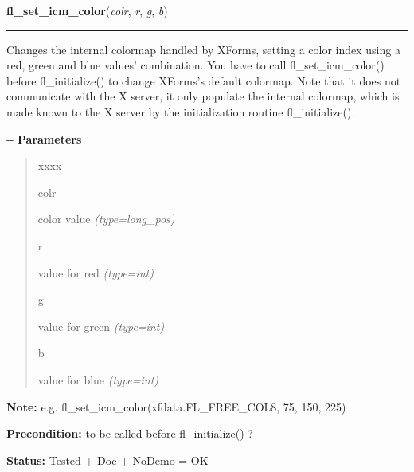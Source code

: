     \vspace{0.5ex}

\hspace{.8\funcindent}\begin{boxedminipage}{\funcwidth}

    \raggedright \textbf{fl\_set\_icm\_color}(\textit{colr}, \textit{r}, \textit{g}, \textit{b})

    \vspace{-1.5ex}

    \rule{\textwidth}{0.5\fboxrule}
\setlength{\parskip}{2ex}

Changes the internal colormap handled by XForms, setting a color index
using a red, green and blue values' combination. You have to call
fl\_set\_icm\_color() before fl\_initialize() to change XForms's default
colormap. Note that it does not communicate with the X server, it only
populate the internal colormap, which is made known to the X server by
the initialization routine fl\_initialize().

-{}-
\setlength{\parskip}{1ex}
      \textbf{Parameters}
      \vspace{-1ex}

      \begin{quote}
        \begin{Ventry}{xxxx}

          \item[colr]


color value
            {\it (type=long\_pos)}

          \item[r]


value for red
            {\it (type=int)}

          \item[g]


value for green
            {\it (type=int)}

          \item[b]


value for blue
            {\it (type=int)}

        \end{Ventry}

      \end{quote}

\textbf{Note:} 
e.g. fl\_set\_icm\_color(xfdata.FL\_FREE\_COL8, 75, 150, 225)


\textbf{Precondition:} 
to be called before fl\_initialize() ?


\textbf{Status:} 
Tested + Doc + NoDemo = OK


    \end{boxedminipage}

